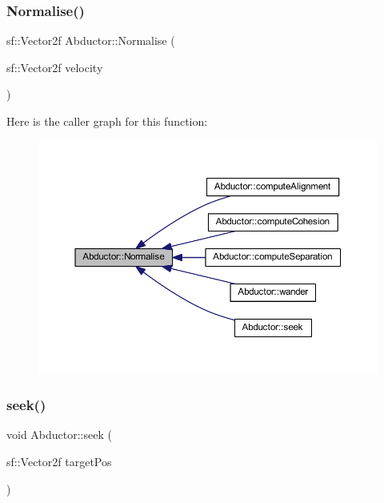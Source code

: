 \mbox{\label{class_abductor_a98f8c01f0131c30842121b0916fe89b2}} 
\subsubsection{\texorpdfstring{Normalise()}{Normalise()}}
{\footnotesize\ttfamily sf\+::\+Vector2f Abductor\+::\+Normalise (\begin{DoxyParamCaption}\item[{sf\+::\+Vector2f}]{velocity }\end{DoxyParamCaption})}

Here is the caller graph for this function\+:
\nopagebreak
\begin{figure}[H]
\begin{center}
\leavevmode
\includegraphics[width=350pt]{class_abductor_a98f8c01f0131c30842121b0916fe89b2_icgraph}
\end{center}
\end{figure}
\mbox{\label{class_abductor_a6562333549ea4d8ef5d389e0594de7c1}} 
\subsubsection{\texorpdfstring{seek()}{seek()}}
{\footnotesize\ttfamily void Abductor\+::seek (\begin{DoxyParamCaption}\item[{sf\+::\+Vector2f}]{target\+Pos }\end{DoxyParamCaption})}

